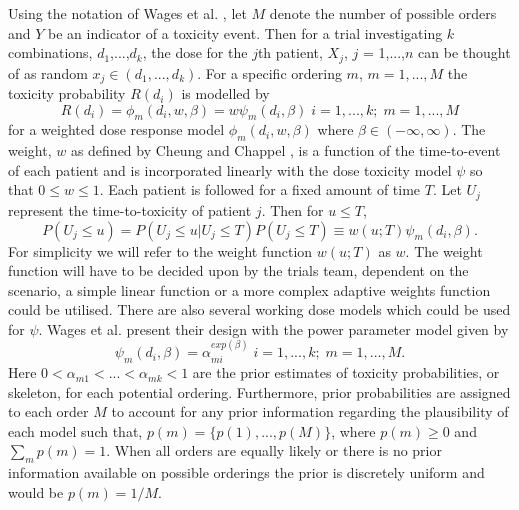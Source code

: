 Using the notation of Wages et al. \cite{wagesContinualReassessmentMethod2011,wagesUsingTimetoeventContinual2013}, let $M$ denote the number of possible orders and $Y$ be an indicator of a toxicity event. Then for a trial investigating $k$ combinations, $d_{1}$,...,$d_{k}$, the dose for the $j$th patient, $X_{j}$, $j$ = 1,...,$n$ can be thought of as random $x_{j} \in (d_{1}, ..., d_{k})$. For a specific ordering $m$, $m = 1,...,M$ the toxicity probability $R(d_{i})$ is modelled by 
\begin{equation}
R(d_{i}) =  \phi_m(d_i,w,\beta) = w\psi_m(d_i,\beta) \; i = 1, ..., k; \; m = 1, ...,M
\end{equation}
for  a weighted dose response model $\phi_m(d_i,w,\beta)$ where $\beta \in (-\infty, \infty)$. The weight, $w$ as defined by Cheung and Chappel \cite{cheungSequentialDesignsPhase2000}, is a function of the time-to-event of each patient and is incorporated linearly with the dose toxicity model $\psi$ so that $0 \leq w \leq 1$. Each patient is followed for a fixed amount of time $T$. Let $U_j$ represent the time-to-toxicity of patient $j$. Then for $u \leq T$, 
\begin{equation}
	P(U_j \leq u ) = P(U_j \leq u |U_j \leq T)P(U_j \leq T) \equiv w(u;T) \psi_m(d_i,\beta).
\end{equation}
For simplicity we will refer to the weight function $w(u;T)$ as $w$. The weight function will have to be decided upon by the trials team, dependent on the scenario, a simple linear function or a more complex adaptive weights function could be utilised. There are also several working dose models which could be used for $\psi$. Wages et al. \cite{wagesUsingTimetoeventContinual2013} present their design with the power parameter model given by 
\begin{equation}
	\psi_m(d_i,\beta) = \alpha_{mi}^{exp(\beta)} \; i = 1,...,k; \; m = 1,...,M.
\end{equation}
Here $0 < \alpha_{m1} < ... < \alpha_{mk} < 1$ are the prior estimates of toxicity probabilities, or skeleton, for each potential ordering. Furthermore, prior probabilities are assigned to each order $M$ to account for any prior information regarding the plausibility of each model such that, $p(m) = \{p(1),...,p(M)\}$, where $p(m) \geq 0$ and $\sum_mp(m)=1$. When all orders are equally likely or there is no prior information available on possible orderings the prior is discretely uniform and would be $p(m) = 1/M$. 

